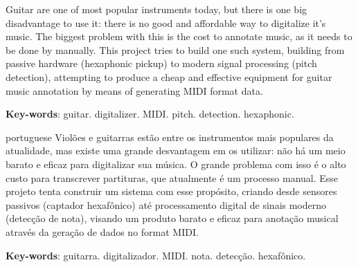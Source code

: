 \setlength{\absparsep}{18pt} %

\begin{summary}[Abstract]
  Guitar are one of most popular instruments today, but there is one big disadvantage
  to use it: there is no good and affordable way to digitalize it's music. The
  biggest problem with this is the cost to annotate music, as it needs to be done
  by manually. This project tries to build one such system, building from passive
  hardware (hexaphonic pickup) to modern signal processing (pitch detection),
  attempting to produce a cheap and effective equipment for guitar music annotation
  by means of generating MIDI format data.


  \textbf{Key-words}: guitar. digitalizer. MIDI. pitch. detection. hexaphonic.
\end{summary}

\begin{summary}[Resumo]
  \begin{otherlanguage*}{portuguese}
    Violões e guitarras estão entre os instrumentos mais populares da atualidade,
    mas existe uma grande desvantagem em os utilizar: não há um meio barato e eficaz
    para digitalizar sua música. O grande problema com isso é o alto custo para
    transcrever partituras, que atualmente é um processo manual. Esse projeto tenta
    construir um sistema com esse propósito, criando desde sensores passivos (captador
    hexafônico) até processamento digital de sinais moderno (detecção de nota),
    visando um produto barato e eficaz para anotação musical através da geração de
    dados no format MIDI.

    \textbf{Key-words}: guitarra. digitalizador. MIDI. nota. detecção. hexafônico.
  \end{otherlanguage*}

\end{summary}

%
%
%

